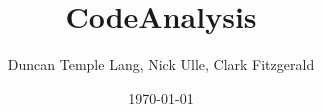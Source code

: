 \documentclass[12pt]{article}
\begin{document}
%

\title{CodeAnalysis}
\date{\today}
\author{Duncan Temple Lang, Nick Ulle, Clark Fitzgerald}
\maketitle





\end{document}
